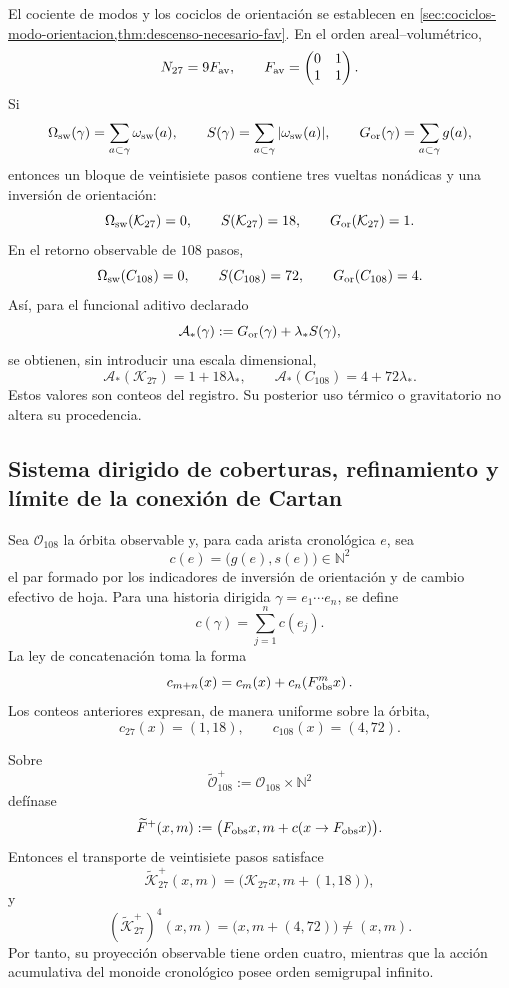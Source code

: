 El cociente de modos y los cociclos de orientación se establecen en
\cref{sec:cociclos-modo-orientacion,thm:descenso-necesario-fav}. En el orden
areal--volumétrico,
\[
 N_{27}=9F_{\rm av},
 \qquad
 F_{\rm av}=
 \begin{pmatrix}0&1\\1&1\end{pmatrix}.
\]
Si
\[
 \Omega_{\rm sw}(\gamma)=\sum_{a\subset\gamma}\omega_{\rm sw}(a),
 \qquad
 S(\gamma)=\sum_{a\subset\gamma}|\omega_{\rm sw}(a)|,
 \qquad
 G_{\rm or}(\gamma)=\sum_{a\subset\gamma}g(a),
\]
entonces un bloque de veintisiete pasos contiene tres vueltas nonádicas y una
inversión de orientación:
\[
 \Omega_{\rm sw}(\mathcal K_{27})=0,\qquad
 S(\mathcal K_{27})=18,\qquad
 G_{\rm or}(\mathcal K_{27})=1.
\]
En el retorno observable de \(108\) pasos,
\[
 \Omega_{\rm sw}(C_{108})=0,\qquad
 S(C_{108})=72,\qquad
 G_{\rm or}(C_{108})=4.
\]
Así, para el funcional aditivo declarado
\[
 \mathcal A_\ast(\gamma)
 :=G_{\rm or}(\gamma)+\lambda_\ast S(\gamma),
\]
se obtienen, sin introducir una escala dimensional,
\[
 \mathcal A_\ast(\mathcal K_{27})=1+18\lambda_\ast,
 \qquad
 \mathcal A_\ast(C_{108})=4+72\lambda_\ast.
\]
Estos valores son conteos del registro. Su posterior uso térmico o
gravitatorio no altera su procedencia.

\subsection{Sistema dirigido de coberturas, refinamiento y límite de la conexión de Cartan}
\label{sec:cobertura-acumulativa-dirigida}

Sea \(\mathcal O_{108}\) la órbita observable y, para cada arista cronológica
\(e\), sea
\[
 c(e)=\bigl(g(e),s(e)\bigr)\in\mathbb N^2
\]
el par formado por los indicadores de inversión de orientación y de cambio
efectivo de hoja. Para una historia dirigida
\(\gamma=e_1\cdots e_n\), se define
\[
 c(\gamma)=\sum_{j=1}^{n}c(e_j).
\]
La ley de concatenación toma la forma
\[
 c_{m+n}(x)
 =c_m(x)+c_n\!\left(F_{\rm obs}^{m}x\right).
\]
Los conteos anteriores expresan, de manera uniforme sobre la órbita,
\[
 c_{27}(x)=(1,18),
 \qquad
 c_{108}(x)=(4,72).
\]

\begin{theorem}
\label{thm:cobertura-acumulativa-dirigida}
Sobre
\[
 \widetilde{\mathcal O}_{108}^{+}
 :=\mathcal O_{108}\times\mathbb N^2
\]
defínase
\[
 \widetilde F^{+}(x,m)
 :=\bigl(F_{\rm obs}x,m+c(x\to F_{\rm obs}x)\bigr).
\]
Entonces el transporte de veintisiete pasos satisface
\[
 \widetilde{\mathcal K}_{27}^{+}(x,m)
 =\bigl(\mathcal K_{27}x,m+(1,18)\bigr),
\]
y
\[
 \left(\widetilde{\mathcal K}_{27}^{+}\right)^4(x,m)
 =\bigl(x,m+(4,72)\bigr)\neq(x,m).
\]
Por tanto, su proyección observable tiene orden cuatro, mientras que la
acción acumulativa del monoide cronológico posee orden semigrupal infinito.
\end{theorem}

